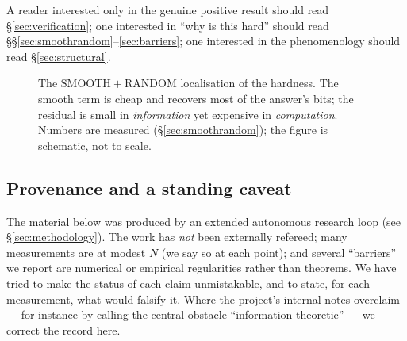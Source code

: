 \documentclass[11pt]{article}
\theoremstyle{plain}
\theoremstyle{definition}
\theoremstyle{remark}
\newcommand{\Rinv}{R^{-1}}
\begin{document}
\noindent A reader interested only in the genuine positive result should read
\S\ref{sec:verification}; one interested in ``why is this hard'' should read
\S\S\ref{sec:smoothrandom}--\ref{sec:barriers}; one interested in the
phenomenology should read \S\ref{sec:structural}.

\begin{figure}[t]
\centering
{}
\caption{The $\mathrm{SMOOTH}+\mathrm{RANDOM}$ localisation of the hardness. The
smooth term is cheap and recovers most of the answer's bits; the residual is
small in \emph{information} yet expensive in \emph{computation}. Numbers are
measured (\S\ref{sec:smoothrandom}); the figure is schematic, not to scale.}
\label{fig:smoothrandom}
\end{figure}

\subsection{Provenance and a standing caveat}

The material below was produced by an extended autonomous research loop (see
\S\ref{sec:methodology}). The work has \emph{not} been externally refereed; many
measurements are at modest $N$ (we say so at each point); and several
``barriers'' we report are numerical or empirical regularities rather than
theorems. We have tried to make the status of each claim unmistakable, and to
state, for each measurement, what would falsify it. Where the project's internal
notes overclaim --- for instance by calling the central obstacle
``information-theoretic'' --- we correct the record here.
\end{document}
